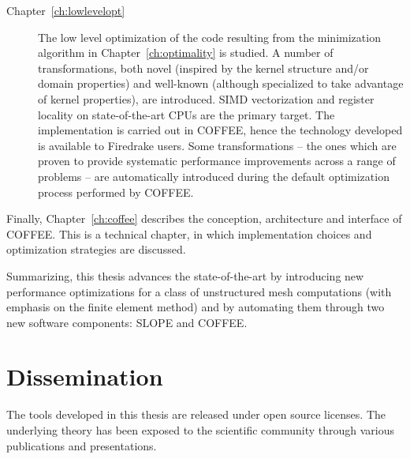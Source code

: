 \begin{description}
\item[Chapter~\ref{ch:lowlevelopt}] The low level optimization of the code resulting from the minimization algorithm in Chapter~\ref{ch:optimality} is studied. A number of transformations, both novel (inspired by the kernel structure and/or domain properties) and well-known (although specialized to take advantage of kernel properties), are introduced. SIMD vectorization and register locality on state-of-the-art CPUs are the primary target. The implementation is carried out in COFFEE, hence the technology developed is available to Firedrake users. Some transformations -- the ones which are proven to provide systematic performance improvements across a range of problems -- are automatically introduced during the default optimization process performed by COFFEE.
\end{description}

Finally, Chapter~\ref{ch:coffee} describes the conception, architecture and interface of COFFEE. This is a technical chapter, in which implementation choices and optimization strategies are discussed.

Summarizing, this thesis advances the state-of-the-art by introducing new performance optimizations for a class of unstructured mesh computations (with emphasis on the finite element method) and by automating them through two new software components: SLOPE and COFFEE.


\section{Dissemination}
The tools developed in this thesis are released under open source licenses. The underlying theory has been exposed to the scientific community through various publications and presentations.

